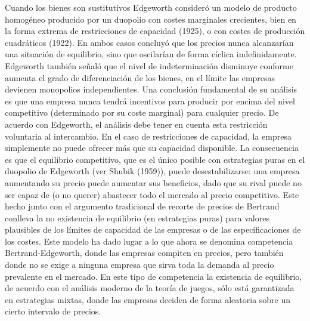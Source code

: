 \documentclass[10pt,a4paper]{article}
\begin{document}
Cuando los bienes son sustitutivos Edgeworth consideró un modelo de producto homogéneo producido por un duopolio con costes marginales crecientes, bien en la forma extrema de restricciones de capacidad (1925), o con costes de producción cuadráticos (1922). En ambos casos concluyó que los precios nunca alcanzarían una situación de equilibrio, sino que oscilarían de forma cíclica indefinidamente. Edgeworth también señaló que el nivel de indeterminación disminuye conforme aumenta el grado de diferenciación de los bienes, en el límite las empresas devienen monopolios independientes. Una conclusión fundamental de su análisis es que una empresa nunca tendrá incentivos para producir por encima del nivel competitivo (determinado por su coste marginal) para cualquier precio. De acuerdo con Edgeworth, el análisis debe tener en cuenta esta restricción voluntaria al intercambio. En el caso de restricciones de capacidad, la empresa simplemente no puede ofrecer más que su capacidad disponible. La consecuencia es que el equilibrio competitivo, que es el único posible con estrategias puras en el duopolio de Edgeworth (ver Shubik (1959)), puede desestabilizarse: una empresa aumentando su precio puede aumentar sus beneficios, dado que su rival puede no ser capaz de (o no querer) abastecer todo el mercado al precio competitivo. Este hecho junto con el argumento tradicional de recorte de precios de Bertrand conlleva la no existencia de equilibrio (en estrategias puras) para valores plausibles de los límites de capacidad de las empresas o de las especificaciones de los costes. Este modelo ha dado lugar a lo que ahora se denomina competencia Bertrand-Edgeworth, donde las empresas compiten en precios, pero también donde no se exige a ninguna empresa que sirva toda la demanda al precio prevalente en el mercado. En este tipo de competencia la existencia de equilibrio, de acuerdo con el análisis moderno de la teoría de juegos, sólo está garantizada en estrategias mixtas, donde las empresas deciden de forma aleatoria sobre un cierto intervalo de precios. 
\end{document}
